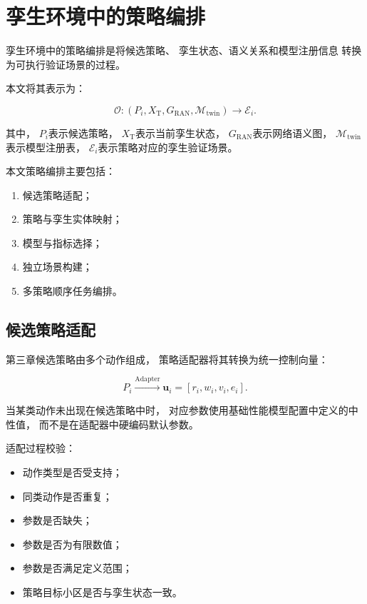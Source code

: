 \documentclass[lang=cn,12pt]{elegantbook}
\begin{document}
\section{孪生环境中的策略编排}
\label{sec:twin_environment_orchestration}

孪生环境中的策略编排是将候选策略、
孪生状态、语义关系和模型注册信息
转换为可执行验证场景的过程。

本文将其表示为：

\begin{equation}
\mathcal{O}
:
\left(
P_i,
X_{\mathrm{T}},
G_{\mathrm{RAN}},
\mathcal{M}_{\mathrm{twin}}
\right)
\rightarrow
\mathcal{E}_i.
\label{eq:twin_orchestration_definition}
\end{equation}

其中，
$P_i$表示候选策略，
$X_{\mathrm{T}}$表示当前孪生状态，
$G_{\mathrm{RAN}}$表示网络语义图，
$\mathcal{M}_{\mathrm{twin}}$表示模型注册表，
$\mathcal{E}_i$表示策略对应的孪生验证场景。

本文策略编排主要包括：

\begin{enumerate}[label=\arabic*)]
    \item 候选策略适配；
    \item 策略与孪生实体映射；
    \item 模型与指标选择；
    \item 独立场景构建；
    \item 多策略顺序任务编排。
\end{enumerate}


\subsection*{候选策略适配}

第三章候选策略由多个动作组成，
策略适配器将其转换为统一控制向量：

\begin{equation}
P_i
\xrightarrow{\mathrm{Adapter}}
\boldsymbol{u}_i
=
\left[
r_i,
w_i,
v_i,
e_i
\right].
\label{eq:candidate_policy_adapter}
\end{equation}

当某类动作未出现在候选策略中时，
对应参数使用基础性能模型配置中定义的中性值，
而不是在适配器中硬编码默认参数。

适配过程校验：

\begin{itemize}
    \item 动作类型是否受支持；
    \item 同类动作是否重复；
    \item 参数是否缺失；
    \item 参数是否为有限数值；
    \item 参数是否满足定义范围；
    \item 策略目标小区是否与孪生状态一致。
\end{itemize}
\end{document}
